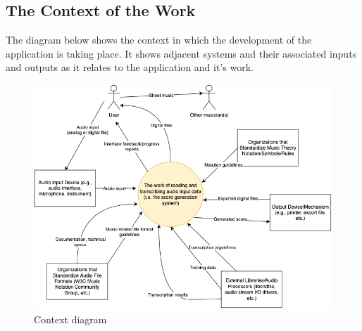 \documentclass[12pt]{article}
\begin{document}
\subsection{The Context of the Work}
The diagram below shows the context in which the development of the application is taking place. It shows
adjacent systems and their associated inputs and outputs as it relates to the application and it's work.
\begin{figure}[H]
  \includegraphics[width=\textwidth]{SRS-contex-diagram-revised.png}
  \caption{Context diagram}
\end{figure}
\end{document}
